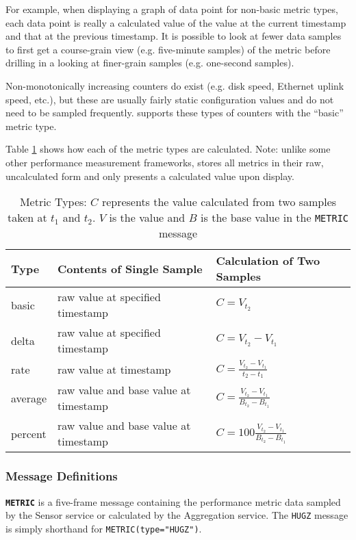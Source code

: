 For example, when displaying a graph of data point for non-basic metric types, each data point is really a calculated
value of the value at the current timestamp and that at the previous timestamp. It is possible to look at fewer data
samples to first get a course-grain view (e.g. five-minute samples) of the metric before drilling in a looking at
finer-grain samples (e.g. one-second samples).

Non-monotonically increasing counters do exist (e.g. disk speed, Ethernet uplink speed, etc.), but these are usually
fairly static configuration values and do not need to be sampled frequently. \dcamp supports these types of counters
with the ``basic'' metric type.

Table \ref{tab:metric_types} shows how each of the \dcamp metric types are calculated. Note: unlike some other
performance measurement frameworks\cite{ganglia}, \dcamp stores all metrics in their raw, uncalculated form and only
presents a calculated value upon display.

\renewcommand{\arraystretch}{1.5}
\begin{table}
\begin{tabular}{ l|l|l }
\hline
\textbf{Type} & \textbf{Contents of Single Sample} & \textbf{Calculation of Two Samples}
\tabularnewline
\hline
basic & raw value at specified timestamp & \( C = V_{t_2} \)
\tabularnewline
delta & raw value at specified timestamp & \( C = V_{t_2} - V_{t_1} \)
\tabularnewline
rate & raw value at timestamp & \( C = \frac{V_{t_2} - V_{t_1}}{t_2 - t_1} \)
\tabularnewline
average & raw value and base value at timestamp & \( C = \frac{V_{t_2} - V_{t_1}}{B_{t_2} - B_{t_1}} \)
\tabularnewline
percent & raw value and base value at timestamp & \( C = 100 \frac{V_{t_2} - V_{t_1}}{B_{t_2} - B_{t_1}} \)
\tabularnewline
\end{tabular}
\caption[Metric Types]
        {Metric Types: \(C\) represents the value calculated from two samples taken at \(t_1\) and \(t_2\). \(V\) is the
	 value and \(B\) is the base value in the \texttt{METRIC} message}
\label{tab:metric_types}
\end{table}

\subsubsection{Message Definitions}

\textbf{\texttt{METRIC}} is a five-frame message containing the performance metric data sampled by the Sensor service or
calculated by the Aggregation service. The \texttt{HUGZ} message is simply shorthand for \texttt{METRIC(type="HUGZ")}.

